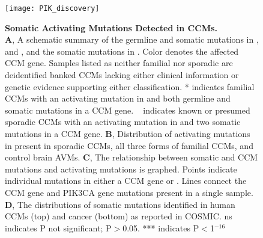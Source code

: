 \begin{figure}[tbp!]
\begin{center}
\texttt{[image: PIK\_discovery]}
\end{center}
\caption[Familial and Sporadic CCM Harbor Somatic Mutations in ] {\textbf{Somatic Activating  Mutations Detected in CCMs.} \\ \textbf{A},  A schematic summary of the germline and somatic mutations in ,  and , and the somatic mutations in . Color denotes the affected CCM gene. Samples listed as neither familial nor sporadic are deidentified banked CCMs lacking either clinical information or genetic evidence supporting either classification. * indicates familial CCMs with an activating mutation in  and both germline and somatic mutations in a CCM gene. \ddag  ~ indicates known or presumed sporadic CCMs with an activating mutation in  and two somatic mutations in a CCM gene. \textbf{B}, Distribution of activating mutations in  present in sporadic CCMs, all three forms of familial CCMs, and control brain AVMs.  \textbf{C}, The relationship between somatic  and CCM mutations and  activating mutations is graphed. Points indicate individual mutations in either a CCM gene or . Lines connect the CCM gene and PIK3CA gene mutations present in a single sample. \textbf{D}, The distributions of somatic  mutations identified in human CCMs (top) and cancer (bottom) as reported in COSMIC. ns indicates P not significant; P$>$0.05. *** indicates P$<$1$^{-16}$}

\label{PIK_discovery}
\end{figure}

